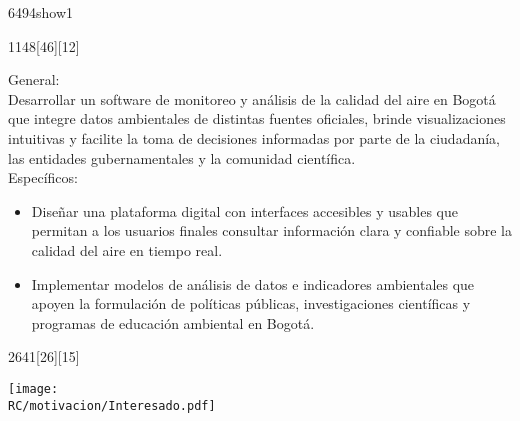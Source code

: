 \begin{NuevaPagina}{64}{94}{show1}
\begin{NuevoParrafo}{11}{48}[46][12]
		\begin{Marco}[\LineaSupC][\LineaInfC][\LineaIzqC][\LineaDerC][CBlanco]
			\begin{Objetivos}[Objetivos]
				{	{\large General:}\vspace{5pt}\\
					{\linespread{.8}\selectfont Desarrollar un software de monitoreo y análisis de la calidad del aire en Bogotá que integre datos ambientales de distintas fuentes oficiales, brinde visualizaciones intuitivas y facilite la toma de decisiones informadas por parte de la ciudadanía, las entidades gubernamentales y la comunidad científica.}\\[0.3cm]
					{\large Específicos:}
					{\begin{itemize}
							\setlength{\itemsep}{-0.5pt}
							\setlength{\parskip}{0pt}
							\setlength{\parsep}{0pt}
							\item Diseñar una plataforma digital con interfaces accesibles y usables que permitan a los usuarios finales consultar información clara y confiable sobre la calidad del aire en tiempo real.
							\item Implementar modelos de análisis de datos e indicadores ambientales que apoyen la formulación de políticas públicas, investigaciones científicas y programas de educación ambiental en Bogotá.
					\end{itemize}}
				}
			\end{Objetivos}
		\end{Marco}
	\end{NuevoParrafo}
	
	
	\begin{NuevoParrafo}{26}{41}[26][15]
		\begin{Marco}[\LineaSupC][\LineaInfC][\LineaIzqC][\LineaDerC][CBlanco]
		\subseccionC{\PVSta}%
		\centering\texttt{[image: \\RC/motivacion/Interesado.pdf]}
		\end{Marco}
	\end{NuevoParrafo}

	

\end{NuevaPagina}
